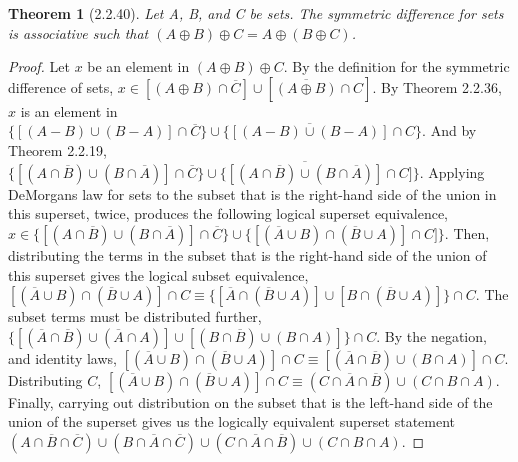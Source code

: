 \documentclass[a4paper, 12pt]{article}
\theoremstyle{plain}
\newtheorem*{theorem*}{Theorem}
\begin{document}
	
	\begin{theorem*}[2.2.40]
		Let A, B, and C be sets. The symmetric difference for sets is associative such that $(A \oplus B) \oplus C = A \oplus (B \oplus C)$.
	\end{theorem*}

	\begin{proof}
		Let $x$ be an element in $(A \oplus B) \oplus C$. By the definition for the symmetric difference of sets,
		$x \in [(A \oplus B) \cap \overline{C}] \cup [\overline{(A \oplus B)} \cap C]$. 
		By Theorem 2.2.36, $x$ is an element in 
		$\{[(A - B) \cup (B - A)] \cap \overline{C}\} \cup \{\overline{[(A - B) \cup (B - A)]} \cap C\}$. 
		And by Theorem 2.2.19,
		$\{[(A \cap \overline{B}) \cup (B \cap \overline{A})] \cap \overline{C}\} \cup \{\overline{[(A \cap \overline{B}) \cup (B \cap \overline{A})]} \cap C]\}$. 
		Applying DeMorgans law for sets to the subset that is the right-hand side of the union in this superset, twice, produces the following logical superset equivalence,
		$x \in \{[(A \cap \overline{B}) \cup (B \cap \overline{A})] \cap \overline{C}\} \cup \{[(\overline{A} \cup B) \cap (\overline{B} \cup A)] \cap C]\}$.
		Then, distributing the terms in the subset that is the right-hand side of the union of this superset gives the logical subset equivalence,
		$[(\overline{A} \cup B) \cap (\overline{B} \cup A)] \cap C \equiv \{[\overline{A} \cap (\overline{B} \cup A)] \cup [B \cap (\overline{B} \cup A)]\} \cap C$. The subset terms must be distributed further,
		$\{[(\overline{A} \cap \overline{B}) \cup (\overline{A} \cap A)] \cup [(B \cap \overline{B}) \cup (B \cap A)]\} \cap C$.
		By the negation, and identity laws,
		$[(\overline{A} \cup B) \cap (\overline{B} \cup A)] \cap C \equiv [(\overline{A} \cap \overline{B}) \cup (B \cap A)] \cap C$. Distributing $C$, $[(\overline{A} \cup B) \cap (\overline{B} \cup A)] \cap C \equiv (C \cap \overline{A} \cap \overline{B}) \cup (C \cap B \cap A)$.
		Finally, carrying out distribution on the subset that is the left-hand side of the union of the superset gives us the logically equivalent superset statement \newline
		$(A \cap \overline{B} \cap \overline{C}) \cup (B \cap \overline{A} \cap \overline{C}) \cup (C \cap \overline{A} \cap \overline{B}) \cup (C \cap B \cap A)$.
		

\end{proof}
\end{document}
